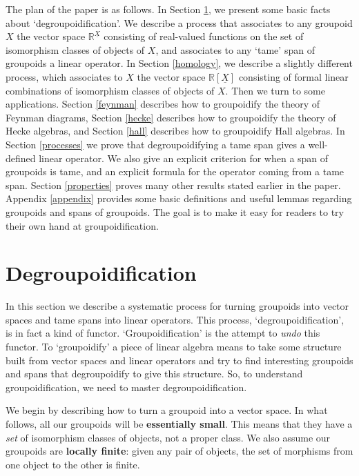\documentclass{article}
\newcommand{\R}{{\mathbb R}}
\renewcommand{\u}[1]{\underline{#1}}
\begin{document}
The plan of the paper is as follows.  In Section
\ref{degroupoidification}, we present some basic facts about
`degroupoidification'.  We describe a process that associates to any
groupoid $X$ the vector space $\R^{\u{X}}$ consisting of real-valued
functions on the set of isomorphism classes of objects of $X$, and
associates to any `tame' span of groupoids a linear operator.  In
Section \ref{homology}, we describe a slightly different process,
which associates to $X$ the vector space $\R[\u{X}]$ consisting of
formal linear combinations of isomorphism classes of objects of $X$.
Then we turn to some applications.  Section \ref{feynman} describes
how to groupoidify the theory of Feynman diagrams, Section \ref{hecke}
describes how to groupoidify the theory of Hecke algebras, and Section
\ref{hall} describes how to groupoidify Hall algebras.  In Section
\ref{processes} we prove that degroupoidifying a tame span gives a
well-defined linear operator.  We also give an explicit criterion for
when a span of groupoids is tame, and an explicit formula for the
operator coming from a tame span.  Section \ref{properties} proves
many other results stated earlier in the paper.  Appendix
\ref{appendix} provides some basic definitions and useful lemmas
regarding groupoids and spans of groupoids.  The goal is to make it
easy for readers to try their own hand at groupoidification.

\section{Degroupoidification}\label{degroupoidification}

In this section we describe a systematic process for turning groupoids
into vector spaces and tame spans into linear operators.  This
process, `degroupoidification', is in fact a kind of functor.
`Groupoidification' is the attempt to {\it undo} this functor.  To
`groupoidify' a piece of linear algebra means to take some structure
built from vector spaces and linear operators and try to find
interesting groupoids and spans that degroupoidify to give this
structure.  So, to understand groupoidification, we need to master
degroupoidification.

We begin by describing how to turn a groupoid into a vector space.  In
what follows, all our groupoids will be \textbf{essentially small}.  This
means that they have a {\it set} of isomorphism classes of objects,
not a proper class.  We also assume our groupoids are \textbf{locally
finite}: given any pair of objects, the set of morphisms from one object 
to the other is finite.
\end{document}
